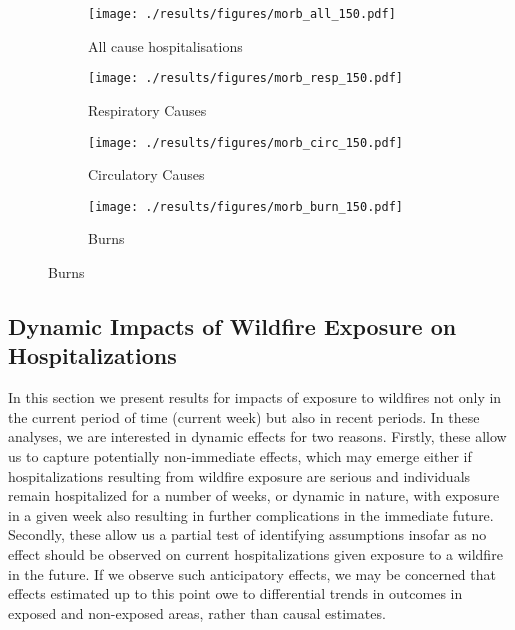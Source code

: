\documentclass[11pt]{article}
\begin{document}
\begin{spacing}{1.5}
\begin{figure}[ht!]
    \centering
    \caption{Impacts of Fire Exposure (Upwind) on Age-Specific Hospitalisations, by Cause}
    \label{fig:hospRF_byAge_types}
    \begin{subfigure}{0.49\textwidth}
    \centering
    \texttt{[image: ./results/figures/morb\_all\_150.pdf]}
    \caption{All cause hospitalisations}
    \end{subfigure}    
    \begin{subfigure}{0.49\textwidth}
    \centering
    \texttt{[image: ./results/figures/morb\_resp\_150.pdf]}
    \caption{Respiratory Causes}
    \end{subfigure}    
    \begin{subfigure}{0.49\textwidth}
    \centering
    \texttt{[image: ./results/figures/morb\_circ\_150.pdf]}
    \caption{Circulatory Causes}
    \end{subfigure}    
    \begin{subfigure}{0.49\textwidth}
    \centering
    \texttt{[image: ./results/figures/morb\_burn\_150.pdf]}
    \caption{Burns}
    \end{subfigure}    
\end{figure}

\subsection{Dynamic Impacts of Wildfire Exposure on Hospitalizations}
\label{sscn:dynmaicEffects}
In this section we present results for impacts of exposure to wildfires not only in the current period of time (current week) but also in recent periods.  In these analyses, we are interested in dynamic effects for two reasons.  Firstly, these allow us to capture potentially non-immediate effects, which may emerge either if hospitalizations resulting from wildfire exposure are serious and individuals remain hospitalized for a number of weeks, or dynamic in nature, with exposure in a given week also resulting in further complications in the immediate future.  Secondly, these allow us a partial test of identifying assumptions insofar as no effect should be observed on current hospitalizations given exposure to a wildfire in the future.  If we observe such anticipatory effects, we may be concerned that effects estimated up to this point owe to differential trends in outcomes in exposed and non-exposed areas, rather than causal estimates.


\end{spacing}
\end{document}
